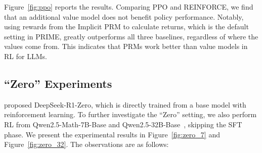 




Figure~\ref{fig:ppo} reports the results. 
Comparing PPO and REINFORCE, we find that an additional value model does not benefit policy performance. 
Notably, using rewards from the Implicit PRM to calculate returns, which is the default setting in PRIME, greatly outperforms all three baselines, regardless of where the values come from. This indicates that PRMs work better than value models in RL for LLMs.



\subsection{``Zero'' Experiments}
\label{sec:app_zero}


\citet{deepseekai2025deepseekr1incentivizingreasoningcapability} proposed DeepSeek-R1-Zero, which is directly trained from a base model with reinforcement learning. To further investigate the ``Zero'' setting, we also perform RL from Qwen2.5-Math-7B-Base and Qwen2.5-32B-Base~\citep{qwen2.5}, skipping the SFT phase. 
We present the experimental results in Figure~\ref{fig:zero_7} and Figure~\ref{fig:zero_32}. The observations are as follows:

